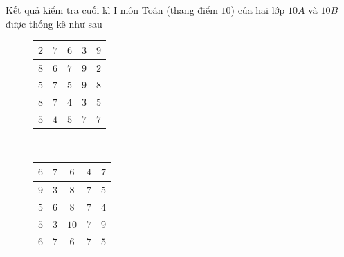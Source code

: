 \begin{ex}%
Kết quả kiểm tra cuối kì I môn Toán (thang điểm $10$) của hai lớp $10A$ và $10B$ được thống kê như sau
\begin{figure}[htb]
\begin{minipage}{0.48\textwidth}
\centering
\begin{tabular}{|c|c|c|c|c|}
\hline $2$ & $7$ & $6$ & $3$ & $9$\\
\hline $8$ & $6$ & $7$ & $9$ & $2$\\
\hline $5$ & $7$ & $5$ & $9$ & $8$\\
\hline $8$ & $7$ & $4$ & $3$ & $5$\\
\hline $5$ & $4$ & $5$ & $7$ & $7$\\
\hline
\end{tabular}\\
\end{minipage}
\hfill
\begin{minipage}{0.48\textwidth}
\centering
\begin{tabular}{|c|c|c|c|c|}
\hline $6$ & $7$ & $6$ & $4$ & $7$\\
\hline $9$ & $3$ & $8$ & $7$ & $5$\\
\hline $5$ & $6$ & $8$ & $7$ & $4$\\
\hline $5$ & $3$ & $10$ & $7$ & $9$\\
\hline $6$ & $7$ & $6$ & $7$ & $5$\\
\hline
\end{tabular}\\
\end{minipage}
\end{figure}


\end{ex}
